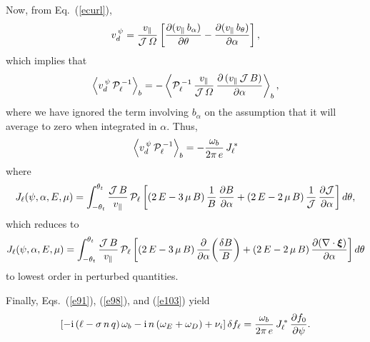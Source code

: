 \documentclass[12pt,prb,aps,notitlepage]{revtex4-1}
\newcommand{\bxi}{\mbox{\boldmath$\xi$}}
\begin{document}
 Now, from Eq.~(\ref{ecurl}), 
 \begin{equation}\label{e101}
 v_d^{\,\psi}= \frac{v_\parallel}{{\cal J}\,{\mit\Omega}}\left[\frac{\partial (v_\parallel\,b_\alpha)}{\partial\theta} - \frac{\partial (v_\parallel\,b_\theta)}{\partial \alpha}\right],
 \end{equation}
 which implies that 
 \begin{equation}
 \left\langle v_d^{\,\psi}\,{\cal P}_{\ell}^{\,-1}\right\rangle_b = -\left\langle{\cal P}_{\ell}^{\,-1}\, \frac{v_\parallel}{{\cal J}\,{\mit\Omega}}\,\frac{\partial \,(v_\parallel\,{\cal J}\,B)}{\partial\alpha}\right\rangle_b,
 \end{equation}
 where we have ignored the term involving $b_\alpha$ on the assumption that it will average to zero when integrated in $\alpha$. 
 Thus,
 \begin{equation}\label{e103}
 \left\langle v_d^{\,\psi}\,{\cal P}_{\ell}^{\,-1}\right\rangle_b =-\frac{\omega_b}{2\pi\,e}\,J_{\ell}^{\,\ast}
 \end{equation}
 where
 \begin{equation}
 J_\ell(\psi,\alpha,E,\mu)= \int_{-\theta_t}^{\theta_t}
 \frac{{\cal J}\,B}{v_\parallel}\,{\cal P}_{\ell}
 \left[(2\,E-3\,\mu\,B)\,\frac{1}{B}\,\frac{\partial B}{\partial \alpha} + (2\,E-2\,\mu\,B)\,\frac{1}{{\cal J}}\,\frac{\partial
 {\cal J}}{\partial\alpha}\right]d\theta,
 \end{equation}
 which reduces to 
 \begin{equation}\label{e126}
 J_\ell(\psi,\alpha,E,\mu)= \int_{-\theta_t}^{\theta_t}
 \frac{{\cal J}\,B}{v_\parallel}\,{\cal P}_{\ell}
 \left[(2\,E-3\,\mu\,B)\,\frac{\partial }{\partial \alpha} \!\left(\frac{\delta B}{B}\right)+ (2\,E-2\,\mu\,B)\,\frac{\partial
(\nabla\cdot\bxi)}{\partial\alpha}\right]d\theta
 \end{equation}
 to lowest order in perturbed quantities. 
 
 Finally, Eqs.~(\ref{e91}), (\ref{e98}), and (\ref{e103}) yield
 \begin{equation}\label{e128}
 \left[-{\rm i}\,(\ell - \sigma\,n\,q)\,\omega_b -{\rm i}\,n\,(\omega_E+\omega_D) + \nu_i\right]\delta f_\ell = \frac{\omega_b}{2\pi\,e}\,J_\ell^{\,\ast}\,\frac{\partial f_0}{\partial \psi}.
 \end{equation}
 
\end{document}
